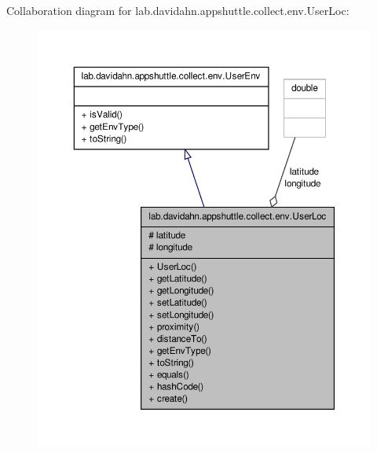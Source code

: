 \-Collaboration diagram for lab.\-davidahn.\-appshuttle.\-collect.\-env.\-User\-Loc\-:
\nopagebreak
\begin{figure}[H]
\begin{center}
\leavevmode
\includegraphics[width=350pt]{classlab_1_1davidahn_1_1appshuttle_1_1collect_1_1env_1_1_user_loc__coll__graph}
\end{center}
\end{figure}
